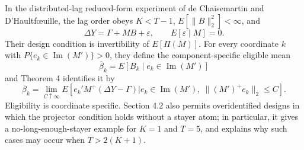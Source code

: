 In the distributed-lag reduced-form experiment of de Chaisemartin and D'Haultf\oe{}uille, the lag order obeys \(K<T-1\), \(E[\lVert B\rVert_2^2]<\infty\), and
\[
\Delta Y=\Gamma+MB+\varepsilon,
\qquad E[\varepsilon\mid M]=0.
\]
Their design condition is invertibility of \(E[\Pi(M)]\). For every coordinate \(k\) with \(P\{e_k\in\operatorname{Im}(M')\}>0\), they define the component-specific eligible mean
\[
\overline\beta_k=E[B_k\mid e_k\in\operatorname{Im}(M')]
\]
and Theorem 4 identifies it by
\[
\overline\beta_k
=\lim_{C\uparrow\infty}
E\!\left[e_k'M^+(\Delta Y-\Gamma)
\mathrel{\big|}e_k\in\operatorname{Im}(M'),\ \lVert(M')^+e_k\rVert_2\le C\right].
\]
Eligibility is coordinate specific. Section 4.2 also permits overidentified designs in which the projector condition holds without a stayer atom; in particular, it gives a no-long-enough-stayer example for \(K=1\) and \(T=5\), and explains why such cases may occur when \(T>2(K+1)\).